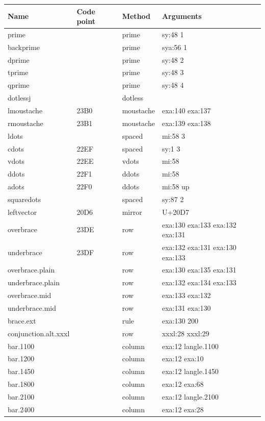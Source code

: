 \begin{longtable}{>{\ttfamily}l>{\ttfamily}l>{\ttfamily}l>{\ttfamily}l}
\toprule
\normalfont Name & \normalfont Code point & \normalfont Method & \normalfont
Arguments \\
\midrule
\endhead
prime & 2032 & prime & sy:48 1 \\
backprime & 2035 & prime & sya:56 1 \\
dprime & 2033 & prime & sy:48 2 \\
tprime & 2034 & prime & sy:48 3 \\
qprime & 2057 & prime & sy:48 4 \\
dotlessj & 0237 & dotless &  \\
lmoustache & 23B0 & moustache & exa:140 exa:137 \\
rmoustache & 23B1 & moustache & exa:139 exa:138 \\
ldots & 2026 & spaced & mi:58 3 \\
cdots & 22EF & spaced & sy:1 3 \\
vdots & 22EE & vdots & mi:58 \\
ddots & 22F1 & ddots & mi:58 \\
adots & 22F0 & ddots & mi:58 up \\
squaredots & 2237 & spaced & sy:87 2 \\
leftvector & 20D6 & mirror & U+20D7 \\
overbrace & 23DE & row & exa:130 exa:133 exa:132 exa:131 \\
underbrace & 23DF & row & exa:132 exa:131 exa:130 exa:133 \\
overbrace.plain &  & row & exa:130 exa:135 exa:131 \\
underbrace.plain &  & row & exa:132 exa:134 exa:133 \\
overbrace.mid &  & row & exa:133 exa:132 \\
underbrace.mid &  & row & exa:131 exa:130 \\
brace.ext &  & rule & exa:130 200 \\
conjunction.alt.xxxl &  & row & xxxl:28 xxxl:29 \\
bar.1100 &  & column & exa:12 langle.1100 \\
bar.1200 &  & column & exa:12 exa:10 \\
bar.1450 &  & column & exa:12 langle.1450 \\
bar.1800 &  & column & exa:12 exa:68 \\
bar.2100 &  & column & exa:12 langle.2100 \\
bar.2400 &  & column & exa:12 exa:28 \\

\end{longtable}

